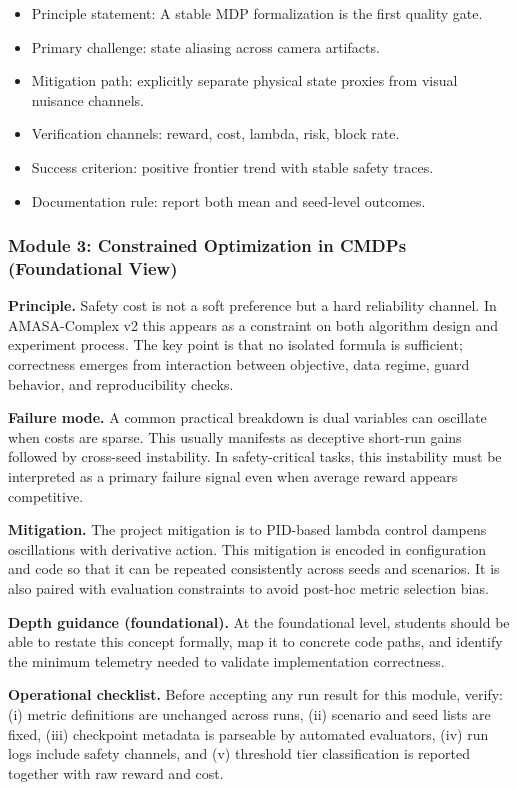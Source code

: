 \documentclass[conference]{IEEEtran}
\begin{document}
\begin{itemize}[leftmargin=*]
  \item Principle statement: A stable MDP formalization is the first quality gate.
  \item Primary challenge: state aliasing across camera artifacts.
  \item Mitigation path: explicitly separate physical state proxies from visual nuisance channels.
  \item Verification channels: reward, cost, lambda, risk, block rate.
  \item Success criterion: positive frontier trend with stable safety traces.
  \item Documentation rule: report both mean and seed-level outcomes.
\end{itemize}


\subsubsection{Module 3: Constrained Optimization in CMDPs (Foundational View)}
\textbf{Principle.} Safety cost is not a soft preference but a hard reliability channel. In AMASA-Complex v2 this appears as a constraint on both algorithm design and experiment process. The key point is that no isolated formula is sufficient; correctness emerges from interaction between objective, data regime, guard behavior, and reproducibility checks.

\textbf{Failure mode.} A common practical breakdown is dual variables can oscillate when costs are sparse. This usually manifests as deceptive short-run gains followed by cross-seed instability. In safety-critical tasks, this instability must be interpreted as a primary failure signal even when average reward appears competitive.

\textbf{Mitigation.} The project mitigation is to PID-based lambda control dampens oscillations with derivative action. This mitigation is encoded in configuration and code so that it can be repeated consistently across seeds and scenarios. It is also paired with evaluation constraints to avoid post-hoc metric selection bias.

\textbf{Depth guidance (foundational).} At the foundational level, students should be able to restate this concept formally, map it to concrete code paths, and identify the minimum telemetry needed to validate implementation correctness.

\textbf{Operational checklist.} Before accepting any run result for this module, verify: (i) metric definitions are unchanged across runs, (ii) scenario and seed lists are fixed, (iii) checkpoint metadata is parseable by automated evaluators, (iv) run logs include safety channels, and (v) threshold tier classification is reported together with raw reward and cost.
\end{document}
